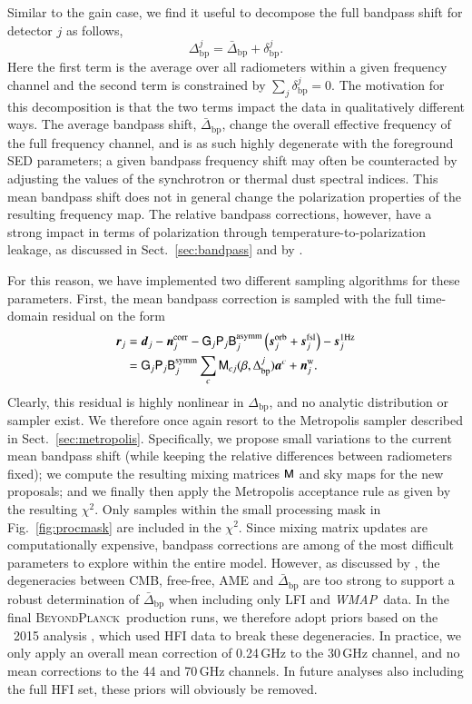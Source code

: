 \documentclass[twocolumn]{aa}
\def\WMAP{\emph{WMAP}}
\renewcommand{\d}[0]{\vec{d}}
\newcommand{\n}[0]{\vec{n}}
\newcommand{\s}[0]{\vec{s}}
\renewcommand{\a}[0]{\vec{a}}
\newcommand{\B}[0]{\tens{B}}
\newcommand{\M}[0]{\tens{M}}
\renewcommand{\r}[0]{\vec{r}}
\renewcommand{\P}[0]{\tens{P}}
\renewcommand{\G}[0]{\tens{G}}
\newcommand{\Dbp}[0]{\Delta_{\mathrm{bp}}}
\newcommand{\BP}{\textsc{BeyondPlanck}}
\begin{document}
Similar to the gain case, we find it useful to decompose the full
bandpass shift for detector $j$ as follows,
\begin{equation}
  \Delta_{\mathrm{bp}}^j = \bar{\Delta}_{\mathrm{bp}} + \delta_{\mathrm{bp}}^j.
\end{equation}
Here the first term is the average over all radiometers within a given
frequency channel and the second term is constrained by $\sum_j
\delta_{\mathrm{bp}}^j = 0$. The motivation for this decomposition is
that the two terms impact the data in qualitatively different
ways. The average bandpass shift, $\bar{\Delta}_{\mathrm{bp}}$, change
the overall effective frequency of the full frequency channel, and is
as such highly degenerate with the foreground SED parameters; a given
bandpass frequency shift may often be counteracted by adjusting the
values of the synchrotron or thermal dust spectral indices. This mean
bandpass shift does not in general change the polarization properties
of the resulting frequency map. The relative bandpass corrections,
however, have a strong impact in terms of polarization through
temperature-to-polarization leakage, as discussed in
Sect.~\ref{sec:bandpass} and by \citet{bp09}.

For this reason, we have implemented two different sampling algorithms
for these parameters. First, the mean bandpass correction is sampled
with the full time-domain residual on the form
\begin{align}
    \r_j &= \d_{j} - \n^{\mathrm{corr}}_{j} - \G_j \P_{j}\B_{j}^{\mathrm{asymm}}\left(\s^{\mathrm{orb}}_{j}  
      + \s^{\mathrm{fsl}}_{j} \right) - \s^{\mathrm{1Hz}}_j \\ &= \G_{j}\P_{j}\B_{j}^{\mathrm{symm}}\sum_{c}
      \M_{cj}(\beta, \Dbp^{j})\a^c  + \n^{\mathrm{w}}_{j}.
      \label{eq:res_bp}
\end{align}
Clearly, this residual is highly nonlinear in $\Delta_{\mathrm{bp}}$,
and no analytic distribution or sampler exist. We therefore once again
resort to the Metropolis sampler described in
Sect.~\ref{sec:metropolis}. Specifically, we propose small variations
to the current mean bandpass shift (while keeping the relative
differences between radiometers fixed); we compute the resulting
mixing matrices $\M$ and sky maps for the new proposals; and we
finally then apply the Metropolis acceptance rule as given by the
resulting $\chi^2$. Only samples within the small processing mask in
Fig.~\ref{fig:procmask} are included in the $\chi^2$. Since mixing
matrix updates are computationally expensive, bandpass corrections are
among of the most difficult parameters to explore within the entire
model. However, as discussed by \citet{bp09}, the degeneracies between
CMB, free-free, AME and $\bar{\Delta}_{\mathrm{bp}}$ are too strong to
support a robust determination of $\bar{\Delta}_{\mathrm{bp}}$ when
including only LFI and \WMAP\ data. In the final \BP\ production runs,
we therefore adopt priors based on the \Planck\ 2015 analysis
\citep{planck2014-a12}, which used HFI data to break these
degeneracies. In practice, we only apply an overall mean correction of
0.24\,GHz to the 30\,GHz channel, and no mean corrections to the 44 and 70\,GHz
channels. In future analyses also including the full HFI set, these
priors will obviously be removed.
\end{document}
